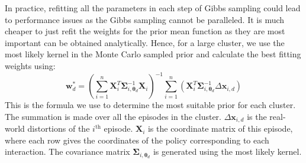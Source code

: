 In practice, refitting all the parameters in each step of Gibbs sampling could lead to performance issues as the Gibbs sampling cannot be paralleled.
It is much cheaper to just refit the weights for the prior mean function as they are most important can be obtained analytically.
Hence, for a large cluster, we use the most likely kernel in the Monte Carlo sampled prior and calculate the best fitting weights using:
\begin{equation}
\bm{w}_d^* = \left(\sum_{i=1}^n
\bm{X}_i^T \bm{\Sigma}_{i, \bm{\theta}_d}^{-1} \bm{X}_i
\right)^{-1} \sum_{i=1}^n \left( \bm{X}^T_i \bm{\Sigma}_{i, \bm{\theta}_d}^{-1} \Delta \bm{x}_{i, d} \right)
\label{refitted_weights}
\end{equation}
This is the formula we use to determine the most suitable prior for each cluster.
The summation is made over all the episodes in the cluster.
$\Delta \bm{x}_{i, d}$ is the real-world distortions of the $i^{\text{th}}$ episode.
$\bm{X}_i$ is the coordinate matrix of this episode, where each row gives the coordinates of the policy corresponding to each interaction.
The covariance matrix $\bm{\Sigma}_{i, \bm{\theta}_d}$ is generated using the most likely kernel.

